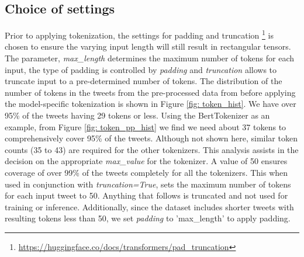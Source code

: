 \subsection{Choice of settings}
Prior to applying tokenization, the settings for padding and truncation \footnote{\url{https://huggingface.co/docs/transformers/pad_truncation}} is chosen to ensure the varying input length will still result in rectangular tensors. The parameter, \textit{max\_length} determines the maximum number of tokens for each input, the type of padding is controlled by \textit{padding} and \textit{truncation} allows to truncate input to a pre-determined number of tokens.
\newline\newline
The distribution of the number of tokens in the tweets from the pre-processed data from \cite{jinModelingSeverityComplaints2021} before applying the model-specific tokenization is shown in Figure \ref{fig: token_hist}. We have over 95\% of the tweets having 29 tokens or less. Using the BertTokenizer as an example, from Figure \ref{fig: token_pp_hist} we find we need about 37 tokens to comprehensively cover 95\% of the tweets. Although not shown here, similar token counts (35 to 43) are required for the other tokenizers. This analysis assists in the decision on the appropriate \textit{max\_value} for the tokenizer. A value of 50 ensures coverage of over 99\% of the tweets completely for all the tokenizers. This when used in conjunction with \textit{truncation=True}, sets the maximum number of tokens for each input tweet to 50. Anything that follows is truncated and not used for training or inference. Additionally, since the dataset includes shorter tweets with resulting tokens less than 50, we set \textit{padding} to 'max\_length' to apply padding.

